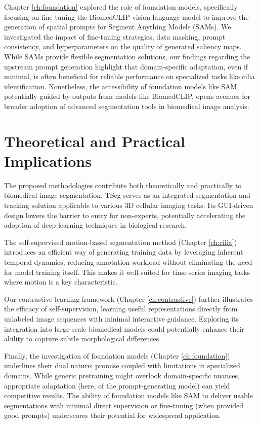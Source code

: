 \documentclass[./dissertation.tex]{subfiles}
\begin{document}
Chapter \ref{ch:foundation} explored the role of foundation models, specifically focusing on fine-tuning the BiomedCLIP vision-language model to improve the generation of spatial prompts for Segment Anything Models (SAMs). We investigated the impact of fine-tuning strategies, data masking, prompt consistency, and hyperparameters on the quality of generated saliency maps. While SAMs provide flexible segmentation solutions, our findings regarding the upstream prompt generation highlight that domain-specific adaptation, even if minimal, is often beneficial for reliable performance on specialized tasks like cilia identification. Nonetheless, the accessibility of foundation models like SAM, potentially guided by outputs from models like BiomedCLIP, opens avenues for broader adoption of advanced segmentation tools in biomedical image analysis.

\section{Theoretical and Practical Implications}
The proposed methodologies contribute both theoretically and practically to biomedical image segmentation. TSeg serves as an integrated segmentation and tracking solution applicable to various 3D cellular imaging tasks. Its GUI-driven design lowers the barrier to entry for non-experts, potentially accelerating the adoption of deep learning techniques in biological research.

The self-supervised motion-based segmentation method (Chapter \ref{ch:cilia}) introduces an efficient way of generating training data by leveraging inherent temporal dynamics, reducing annotation workload without eliminating the need for model training itself. This makes it well-suited for time-series imaging tasks where motion is a key characteristic.

Our contrastive learning framework (Chapter \ref{ch:contrastive}) further illustrates the efficacy of self-supervision, learning useful representations directly from unlabeled image sequences with minimal interactive guidance. Exploring its integration into large-scale biomedical models could potentially enhance their ability to capture subtle morphological differences.

Finally, the investigation of foundation models (Chapter \ref{ch:foundation}) underlines their dual nature: promise coupled with limitations in specialized domains. While generic pretraining might overlook domain-specific nuances, appropriate adaptation (here, of the prompt-generating model) can yield competitive results. The ability of foundation models like SAM to deliver usable segmentations with minimal direct supervision or fine-tuning (when provided good prompts) underscores their potential for widespread application.
\end{document}
